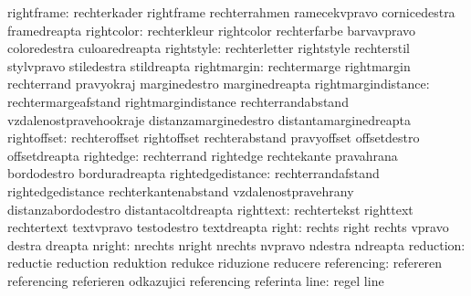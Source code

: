                rightframe: rechterkader              rightframe
                           rechterrahmen             ramecekvpravo
                           cornicedestra             framedreapta
               rightcolor: rechterkleur              rightcolor
                           rechterfarbe              barvavpravo
                           coloredestra              culoaredreapta
               rightstyle: rechterletter             rightstyle
                           rechterstil               stylvpravo
                           stiledestra               stildreapta
              rightmargin: rechtermarge              rightmargin
                           rechterrand               pravyokraj
                           marginedestro             marginedreapta
      rightmargindistance: rechtermargeafstand       rightmargindistance
                           rechterrandabstand        vzdalenostpravehookraje
                           distanzamarginedestro     distantamarginedreapta
              rightoffset: rechteroffset             rightoffset
                           rechterabstand            pravyoffset
                           offsetdestro              offsetdreapta
                rightedge: rechterrand               rightedge
                           rechtekante               pravahrana
                           bordodestro               borduradreapta
        rightedgedistance: rechterrandafstand        rightedgedistance
                           rechterkantenabstand      vzdalenostpravehrany
                           distanzabordodestro       distantacoltdreapta
                righttext: rechtertekst              righttext
                           rechtertext               textvpravo
                           testodestro               textdreapta %
                    right: rechts                    right
                           rechts                    vpravo
                           destra                    dreapta
                   nright: nrechts                   nright
                           nrechts                   nvpravo
                           ndestra                   ndreapta
                reduction: reductie                  reduction
                           reduktion                 redukce
                           riduzione                 reducere
              referencing: refereren                 referencing
                           referieren                odkazujici
                           referencing               referinta %
                     line: regel                     line
